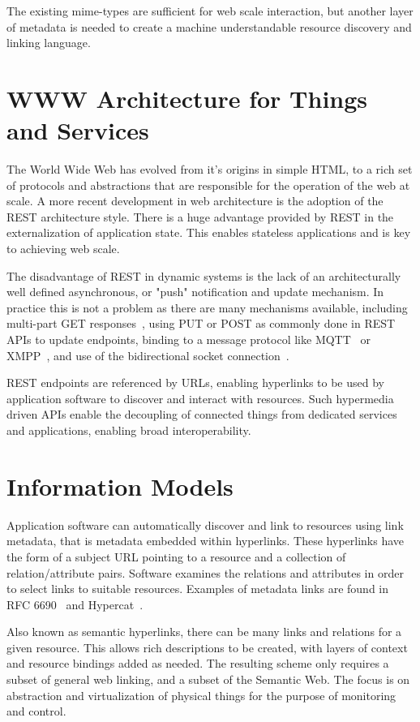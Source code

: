 \documentclass[journal]{IEEEtran}
\begin{document}
The existing mime-types are sufficient for web scale interaction, but another layer of metadata is needed to create a machine understandable resource discovery and linking language.

\section{WWW Architecture for Things and Services}

The World Wide Web has evolved from it’s origins in simple HTML, to a rich set of protocols and abstractions that are responsible for the operation of the web at scale. A more recent development in web architecture is the adoption of the REST architecture style. There is a huge advantage provided by REST in the externalization of application state. This enables stateless applications and is key to achieving web scale. 

The disadvantage of REST in dynamic systems is the lack of an architecturally well defined asynchronous, or "push" notification and update mechanism. In practice this is not a problem as there are many mechanisms available, including multi-part GET responses~\cite{draft-ietf-core-coap}, using PUT or POST as commonly done in REST APIs to update endpoints, binding to a message protocol like MQTT~\cite{MQTT} or XMPP~\cite{RFC6120}, and use of the bidirectional socket connection~\cite{RFC6455}.

REST endpoints are referenced by URLs, enabling hyperlinks to be used by application software to discover and interact with resources. Such hypermedia driven APIs enable the decoupling of connected things from dedicated services and applications, enabling broad interoperability. 

\section{Information Models}
 
Application software can automatically discover and link to resources using link metadata, that is metadata embedded within hyperlinks. These hyperlinks have the form of a subject URL pointing to a resource and a collection of relation/attribute pairs. Software examines the relations and attributes in order to select links to suitable resources. Examples of metadata links are found in RFC 6690~\cite{RFC6690} and Hypercat~\cite{HyperCat}.

Also known as semantic hyperlinks, there can be many links and relations for a given resource. This allows rich descriptions to be created, with layers of context and resource bindings added as needed. The resulting scheme only requires a subset of general web linking, and a subset of the Semantic Web. The focus is on abstraction and virtualization of physical things for the purpose of monitoring and control. 
\end{document}
